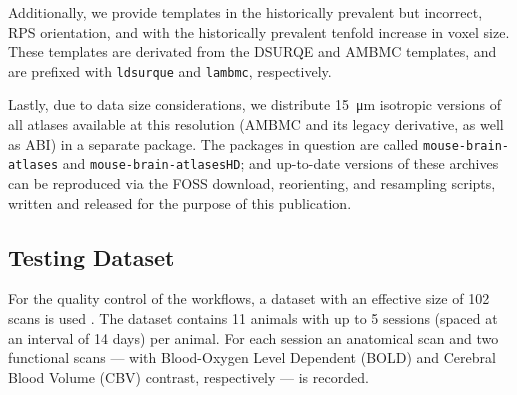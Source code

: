 Additionally, we provide templates in the historically prevalent but incorrect, RPS orientation, and with the historically prevalent tenfold increase in voxel size.
These templates are derivated from the DSURQE and AMBMC templates, and are prefixed with \textcolor{mg}{\texttt{ldsurque}} and \textcolor{mg}{\texttt{lambmc}}, respectively.

Lastly, due to data size considerations, we distribute \SI{15}{\micro\meter} isotropic versions of all atlases available at this resolution (AMBMC and its legacy derivative, as well as ABI) in a separate package.
The packages in question are called \textcolor{mg}{\texttt{mouse-brain-atlases}} and \textcolor{mg}{\texttt{mouse-brain-atlasesHD}};
and up-to-date versions of these archives can be reproduced via the FOSS download, reorienting, and resampling scripts, written and released for the purpose of this publication.  

\subsection{Testing Dataset}



For the quality control of the workflows, a dataset with an effective size of 102 scans is used .
The dataset contains 11 animals with up to 5 sessions (spaced at an interval of 14 days) per animal.
For each session an anatomical scan and two functional scans --- with Blood-Oxygen Level Dependent (BOLD) and Cerebral Blood Volume (CBV) contrast, respectively --- is recorded.

